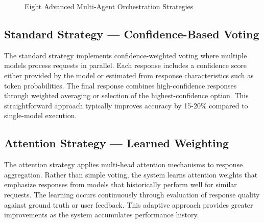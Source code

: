 \documentclass[12pt,a4paper,twoside]{report}
\begin{document}
\begin{figure}[p]
\caption{Eight Advanced Multi-Agent Orchestration Strategies}
\label{fig:moa-strategies}
\end{figure}

\subsection{Standard Strategy — Confidence-Based Voting}

The standard strategy implements confidence-weighted voting where multiple models process requests in parallel. Each response includes a confidence score either provided by the model or estimated from response characteristics such as token probabilities. The final response combines high-confidence responses through weighted averaging or selection of the highest-confidence option. This straightforward approach typically improves accuracy by 15-20\% compared to single-model execution.

\subsection{Attention Strategy — Learned Weighting}

The attention strategy applies multi-head attention mechanisms to response aggregation. Rather than simple voting, the system learns attention weights that emphasize responses from models that historically perform well for similar requests. The learning occurs continuously through evaluation of response quality against ground truth or user feedback. This adaptive approach provides greater improvements as the system accumulates performance history.
\end{document}
